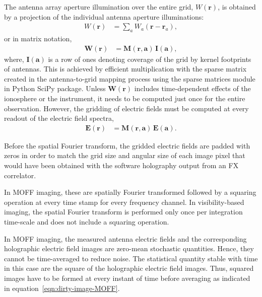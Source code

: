 \documentclass[a4paper,fleqn,usenatbib]{mnras}
\begin{document}
\par\medskip
{}
\par\medskip
\noindent The antenna array aperture illumination over the entire grid, $W(\mathbf{r})$, is obtained by a projection of the individual antenna aperture illuminations:
\begin{align}\label{eqn:gridding-convolution}
  W(\mathbf{r}) &= \sum_a W_a(\mathbf{r}-\mathbf{r}_a),
\end{align}
or in matrix notation,
\begin{align}
  \mathbf{W}(\mathbf{r}) &= \mathbf{M}(\mathbf{r},\mathbf{a})\,\mathbf{I}(\mathbf{a}),
\end{align}
where, $\mathbf{I}(\mathbf{a})$ is a row of ones denoting coverage of the grid by kernel footprints of antennas. This is achieved by efficient multiplication with the sparse matrix created in the antenna-to-grid mapping process using the sparse matrices module in Python SciPy package. Unless $\mathbf{W}(\mathbf{r})$ includes time-dependent effects of the ionosphere or the instrument, it needs to be computed just once for the entire observation. However, the gridding of electric fields must be computed at every readout of the electric field spectra,
\begin{align}
  \mathbf{E}(\mathbf{r}) &= \mathbf{M}(\mathbf{r},\mathbf{a})\,\mathbf{E}(\mathbf{a}).
\end{align}

\par\medskip
{}
\par\medskip
\noindent Before the spatial Fourier transform, the gridded electric fields are 
padded with zeros in order to match the grid size and angular size of each image 
pixel that would have been obtained with the software holography output from an 
FX correlator. 

In MOFF imaging, these are spatially Fourier transformed followed by a squaring
operation at every time stamp for every frequency channel. In visibility-based 
imaging, the spatial Fourier transform is performed only once per integration 
time-scale and does not include a squaring operation.

\par\medskip
{}
\par\medskip
\noindent In MOFF imaging, the measured antenna electric fields and the 
corresponding holographic electric field images are zero-mean stochastic 
quantities. Hence, they cannot be time-averaged to reduce noise. The statistical 
quantity stable with time in this case are the square of the holographic 
electric field images. Thus, squared images have to be formed at every instant 
of time before averaging as indicated in equation~\ref{eqn:dirty-image-MOFF}.
\end{document}
